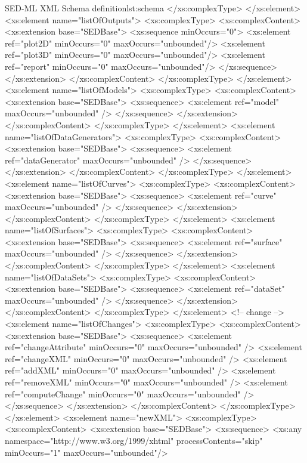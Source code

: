 \begin{myXmlLst}{SED-ML XML Schema definition}{lst:schema}
		</xs:complexType>
	</xs:element>
	<xs:element name="listOfOutputs">
		<xs:complexType>
		<xs:complexContent>
		<xs:extension base="SEDBase">
			<xs:sequence minOccurs="0">
				<xs:element ref="plot2D" minOccurs="0"  maxOccurs="unbounded"/>
				<xs:element ref="plot3D" minOccurs="0"  maxOccurs="unbounded"/>
				<xs:element ref="report" minOccurs="0"  maxOccurs="unbounded"/>
			</xs:sequence>
		</xs:extension>
		</xs:complexContent>
		</xs:complexType>
	</xs:element>
	<xs:element name="listOfModels">
		<xs:complexType>
		<xs:complexContent>
		<xs:extension base="SEDBase">
			<xs:sequence>
				<xs:element ref="model" maxOccurs="unbounded" />
			</xs:sequence>
		</xs:extension>
		</xs:complexContent>
		</xs:complexType>
	</xs:element>
	<xs:element name="listOfDataGenerators">
		<xs:complexType>
		<xs:complexContent>
		<xs:extension base="SEDBase">
			<xs:sequence>
				<xs:element ref="dataGenerator" maxOccurs="unbounded" />
			</xs:sequence>
		</xs:extension>
		</xs:complexContent>
		</xs:complexType>
	</xs:element>
	<xs:element name="listOfCurves">
		<xs:complexType>
		<xs:complexContent>
		<xs:extension base="SEDBase">
			<xs:sequence>
				<xs:element ref="curve" maxOccurs="unbounded" />
			</xs:sequence>
		</xs:extension>
		</xs:complexContent>
		</xs:complexType>
	</xs:element>
	<xs:element name="listOfSurfaces">
		<xs:complexType>
		<xs:complexContent>
		<xs:extension base="SEDBase">
			<xs:sequence>
				<xs:element ref="surface" maxOccurs="unbounded" />
			</xs:sequence>
		</xs:extension>
		</xs:complexContent>
		</xs:complexType>
	</xs:element>
	<xs:element name="listOfDataSets">
		<xs:complexType>
		<xs:complexContent>
		<xs:extension base="SEDBase">
			<xs:sequence>
				<xs:element ref="dataSet" maxOccurs="unbounded" />
			</xs:sequence>
		</xs:extension>
		</xs:complexContent>
		</xs:complexType>
	</xs:element>
	<!-- change -->
	<xs:element name="listOfChanges">
		<xs:complexType>
		<xs:complexContent>
		<xs:extension base="SEDBase">
			<xs:sequence>
				<xs:element ref="changeAttribute" minOccurs="0"	maxOccurs="unbounded" />
				<xs:element ref="changeXML" minOccurs="0" maxOccurs="unbounded" />
				<xs:element ref="addXML" minOccurs="0" maxOccurs="unbounded" />
				<xs:element ref="removeXML" minOccurs="0" maxOccurs="unbounded" />
				<xs:element ref="computeChange" minOccurs="0" maxOccurs="unbounded" />
			</xs:sequence>
		</xs:extension>
		</xs:complexContent>
		</xs:complexType>
	</xs:element>
 	<xs:element name="newXML">
	 	<xs:complexType>
		<xs:complexContent>
		<xs:extension base="SEDBase"> 		 	
			 <xs:sequence>
				 <xs:any namespace="http://www.w3.org/1999/xhtml" processContents="skip" minOccurs="1" maxOccurs="unbounded"/>

\end{myXmlLst}
